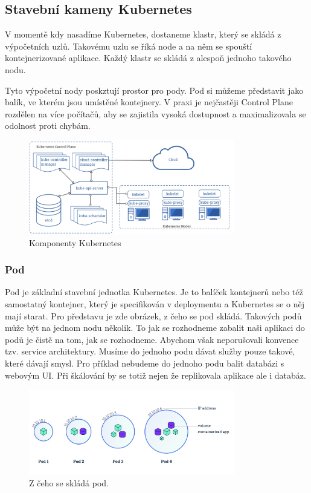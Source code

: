 \subsection{Stavební kameny Kubernetes}

V momentě kdy nasadíme Kubernetes, dostaneme klastr, který se skládá z výpočetních uzlů. Takovému uzlu se říká node a na něm se spouští kontejnerizované aplikace. Každý klastr se skládá z alespoň jednoho takového nodu. 

Tyto výpočetní nody poskztují prostor pro pody. Pod si můžeme představit jako balík, ve kterém jsou umístěné kontejnery. V praxi je nejčastěji Control Plane rozdělen na více počítačů, aby se zajistila vysoká dostupnost a maximalizovala se odolnost proti chybám. 

\begin{figure}[!h]
	\centering
 	\includegraphics[width=0.8\textwidth, angle=0]{kubernetes-architecture.png}
 	\caption[Komponenty Kubernetes]{Komponenty Kubernetes}\label{fig:float}
\end{figure}

\subsubsection{Pod}
Pod je základní stavební jednotka Kubernetes. Je to balíček kontejnerů nebo též samostatný kontejner, který je specifikován v deploymentu a Kubernetes se o něj mají starat. Pro představu je zde obrázek, z čeho se pod skládá. Takových podů může být na jednom nodu několik. To jak se rozhodneme zabalit naši aplikaci do podů je čistě na tom, jak se rozhodneme. Abychom však neporušovali konvence tzv. service architektury. Musíme do jednoho podu dávat služby pouze takové, které dávají smysl. Pro příklad nebudeme do jednoho podu balit databázi s webovým UI. Při škálování by se totiž nejen že replikovala aplikace ale i databáz.  

\begin{figure}[!h]
	\centering
 	\includegraphics[width=0.8\textwidth, angle=0]{kubernetes-pod.png}
 	\caption[Kubernetes Pod]{Z čeho se skládá pod.}\label{fig:float}
\end{figure}



